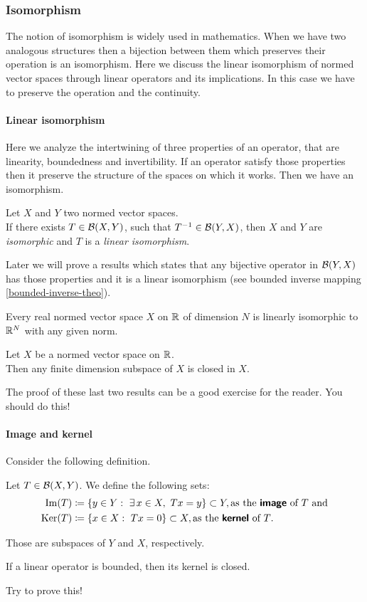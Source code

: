 \subsubsection{Isomorphism} The notion of isomorphism is widely used in mathematics. When we have two analogous structures then a bijection between them which preserves their operation is an isomorphism.
Here we discuss the linear isomorphism of normed vector spaces through linear operators and its implications. In this case we have to preserve the operation and the continuity. 

\paragraph{Linear isomorphism} Here we analyze the intertwining of three properties of an operator, that are linearity, boundedness and invertibility. If an operator satisfy those properties then it preserve the structure of the spaces on which it works. Then we have an isomorphism.
\begin{defn}
	Let $X$ and $Y$ two normed vector spaces.\\
	If there exists $T \in \mathcal B(X,Y)$, such that $T^{-1} \in \mathcal B(Y,X)$, then $X$ and $Y$ are \emph{isomorphic} and $T$ is a \emph{linear isomorphism}.
\end{defn}
Later we will prove a results which states that any bijective operator in $\mathcal B(Y,X)$ has those properties and it is a linear isomorphism (see bounded inverse mapping \vref{bounded-inverse-theo}).

\begin{theo}
	Every real normed vector space $X$ on $\mathbb R$ of dimension $N$ is linearly isomorphic to $\mathbb R^N$ with any given norm.
\end{theo}

\begin{coro}
	Let $X$ be a normed vector space on $\mathbb R$.\\
	Then any finite dimension subspace of $X$ is closed in $X$.
\end{coro}

The proof of these last two results can be a good exercise for the reader. You should do this!

\paragraph{Image and kernel} Consider the following definition.
\begin{defn}
	Let $T\in \mathcal B(X,Y)$. We define the following sets:
	\begin{align*}
	\operatorname{Im}(T) &\coloneqq \{y\in Y: \ \exists \, x \in X, \ Tx=y\} \subset Y,
	\text{as the {\sffamily\bfseries image} of $T$ and} \\
	\operatorname{Ker}(T) &\coloneqq \{x \in X : \ Tx=0\} \subset X,
	\text{as the {\sffamily\bfseries kernel} of $T$.}
	\end{align*}
\end{defn}
Those are subspaces of $Y$ and $X$, respectively.\\
\begin{prop}
	If a linear operator is bounded, then its kernel is closed.
\end{prop}
Try to prove this!

